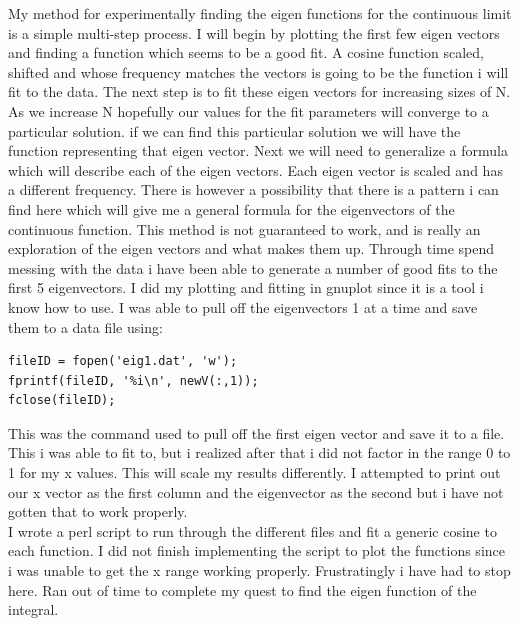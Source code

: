 \documentclass[12pt]{article}
\begin{document}
My method for experimentally finding the eigen functions for the continuous limit is a simple multi-step process. I will begin by plotting the first few eigen vectors and finding a function which seems to be a good fit. A cosine function scaled, shifted and whose frequency matches the vectors is going to be the function i will fit to the data. The next step is to fit these eigen vectors for increasing sizes of N. As we increase N hopefully our values for the fit parameters will converge to a particular solution. if we can find this particular solution we will have the function representing that eigen vector. Next we will need to generalize a formula which will describe each of the eigen vectors. Each eigen vector is scaled and has a different frequency. There is however a possibility that there is a pattern i can find here which will give me a general formula for the eigenvectors of the continuous function. This method is not guaranteed to work, and is really an exploration of the eigen vectors and what makes them up. Through time spend messing with the data i have been able to generate a number of good fits to the first 5 eigenvectors. I did my plotting and fitting in gnuplot since it is a tool i know how to use. I was able to pull off the eigenvectors 1 at a time and save them to a data file using:\\

\begin{verbatim}
fileID = fopen('eig1.dat', 'w');
fprintf(fileID, '%i\n', newV(:,1));
fclose(fileID);
\end{verbatim}

This was the command used to pull off the first eigen vector and save it to a file. This i was able to fit to, but i realized after that i did not factor in the range 0 to 1 for my x values. This will scale my results differently. I attempted to print out our x vector as the first column and the eigenvector as the second but i have not gotten that to work properly.\\

I wrote a perl script to run through the different files and fit a generic cosine to each function. I did not finish implementing the script to plot the functions since i was unable to get the x range working properly. Frustratingly i have had to stop here. Ran out of time to complete my quest to find the eigen function of the integral.   
\end{document}
